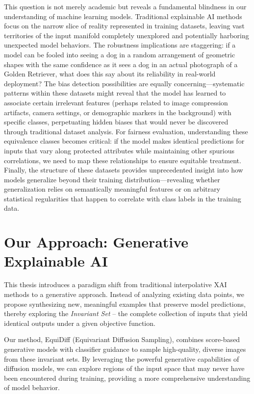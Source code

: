 \documentclass[licencjacka,en]{pracamgr}
\newcommand{\method}[1]{EquiDiff}  %
\begin{document}
This question is not merely academic but reveals a fundamental blindness in our understanding of machine learning models. Traditional explainable AI methods focus on the narrow slice of reality represented in training datasets, leaving vast territories of the input manifold completely unexplored and potentially harboring unexpected model behaviors. The robustness implications are staggering: if a model can be fooled into seeing a dog in a random arrangement of geometric shapes with the same confidence as it sees a dog in an actual photograph of a Golden Retriever, what does this say about its reliability in real-world deployment? The bias detection possibilities are equally concerning—systematic patterns within these datasets might reveal that the model has learned to associate certain irrelevant features (perhaps related to image compression artifacts, camera settings, or demographic markers in the background) with specific classes, perpetuating hidden biases that would never be discovered through traditional dataset analysis. For fairness evaluation, understanding these equivalence classes becomes critical: if the model makes identical predictions for inputs that vary along protected attributes while maintaining other spurious correlations, we need to map these relationships to ensure equitable treatment. Finally, the structure of these datasets provides unprecedented insight into how models generalize beyond their training distribution—revealing whether generalization relies on semantically meaningful features or on arbitrary statistical regularities that happen to correlate with class labels in the training data.

\section{Our Approach: Generative Explainable AI}

This thesis introduces a paradigm shift from traditional interpolative XAI methods to a generative approach. Instead of analyzing existing data points, we propose synthesizing new, meaningful examples that preserve model predictions, thereby exploring the \textit{Invariant Set} -- the complete collection of inputs that yield identical outputs under a given objective function.

Our method, \method{} (Equivariant Diffusion Sampling), combines score-based generative models with classifier guidance to sample high-quality, diverse images from these invariant sets. By leveraging the powerful generative capabilities of diffusion models, we can explore regions of the input space that may never have been encountered during training, providing a more comprehensive understanding of model behavior.
\end{document}
